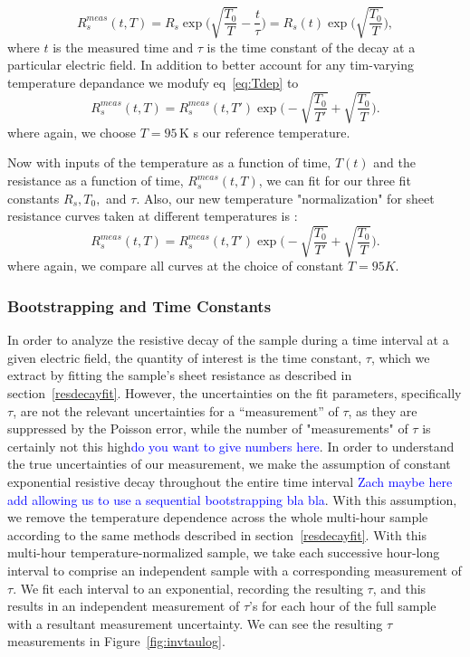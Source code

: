 \documentclass[a4paper,12pt]{article}
\newcommand{\RI}[1]{\textcolor{blue}{#1}}
\begin{document}
\begin{equation}
	R_{s}^{meas}(t,T)=R_s\exp\bigg(\sqrt{\frac{T_0}{T}}- \frac{t}{\tau}\bigg)=R_s(t)\exp\bigg(\sqrt{\frac{T_0}{T}}\bigg),
\end{equation}
where $t$ is the measured time and $\tau$ is the time constant of the decay at a particular electric field. In addition to better account for any tim-varying temperature depandance we modufy eq~\ref{eq:Tdep} to
\begin{equation}
	R_{s}^{meas}(t,T)=R_{s}^{meas}(t,T')\exp\bigg(-\sqrt{\frac{T_0}{T'}}+\sqrt{\frac{T_0}{T}}\bigg).
\end{equation}
where again, we choose $T=95$\,K s our reference temperature.

Now with inputs of the temperature as a function of time, $T(t)$ and the resistance as a function of time, $R_{s}^{meas}(t,T)$, we can fit for our three fit constants $R_s,T_0,$ and $\tau$.
Also, our new temperature "normalization" for sheet resistance curves taken at different temperatures is :
\begin{equation}
R_{s}^{meas}(t,T)=R_{s}^{meas}(t,T')\exp\bigg(-\sqrt{\frac{T_0}{T'}}+\sqrt{\frac{T_0}{T}}\bigg).
\end{equation}
where again, we compare all curves at the choice of constant $T=95K$.


\subsubsection{Bootstrapping and Time Constants}
In order to analyze the resistive decay of the sample during a time interval at a given electric field, the quantity of interest is the time constant, $\tau$, which we extract by fitting the sample's sheet resistance as described in section~\ref{resdecayfit}. However, the uncertainties on the fit parameters, specifically $\tau$, are not the relevant uncertainties for a ``measurement'' of $\tau$, as they are suppressed by the Poisson error, while the number of "measurements" of $\tau$ is certainly not this high\RI{do you want to give numbers here}. In order to understand the true uncertainties of our measurement, we make the assumption of constant exponential resistive decay throughout the entire time interval \RI{Zach maybe here add allowing us to use a sequential bootstrapping bla bla}. With this assumption, we remove the temperature dependence across the whole multi-hour sample according to the same methods described in section~\ref{resdecayfit}. With this multi-hour temperature-normalized sample, we take each successive hour-long interval to comprise an independent sample with a corresponding measurement of $\tau$. We fit each interval to an exponential, recording the resulting $\tau$, and this results in an independent measurement of $\tau$'s for each hour of the full sample with a resultant measurement uncertainty. We can see the resulting $\tau$ measurements in Figure~\ref{fig:invtaulog}.
\end{document}
